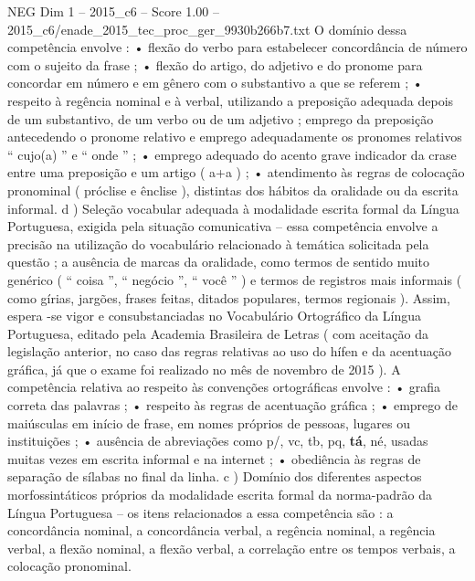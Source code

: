 \begin{textsample}{NEG Dim 1 – 2015\_c6 – Score 1.00 – 2015\_c6/enade\_2015\_tec\_proc\_ger\_9930b266b7.txt}
O domínio dessa competência envolve : • flexão do verbo para estabelecer concordância de número com o sujeito da frase ; • flexão do artigo, do adjetivo e do pronome para concordar em número e em gênero com o substantivo a que se referem ; • respeito à regência nominal e à verbal, utilizando a preposição adequada depois de um substantivo, de um verbo ou de um adjetivo ; emprego da preposição antecedendo o pronome relativo e emprego adequadamente os pronomes relativos “ cujo(a) ” e “ onde ” ; • emprego adequado do acento grave indicador da crase entre uma preposição e um artigo ( a+a ) ; • atendimento às regras de colocação pronominal ( próclise e ênclise ), distintas dos hábitos da oralidade ou da escrita informal. d ) Seleção vocabular adequada à modalidade escrita formal da Língua Portuguesa, exigida pela situação comunicativa – essa competência envolve a precisão na utilização do vocabulário relacionado à temática solicitada pela questão ; a ausência de marcas da oralidade, como termos de sentido muito genérico ( “ coisa ”, “ negócio ”, “ você ” ) e termos de registros mais informais ( como gírias, jargões, frases feitas, ditados populares, termos regionais ).
Assim, espera -se vigor e consubstanciadas no Vocabulário Ortográfico da Língua Portuguesa, editado pela Academia Brasileira de Letras ( com aceitação da legislação anterior, no caso das regras relativas ao uso do hífen e da acentuação gráfica, já que o exame foi realizado no mês de novembro de 2015 ).
A competência relativa ao respeito às convenções ortográficas envolve : • grafia correta das palavras ; • respeito às regras de acentuação gráfica ; • emprego de maiúsculas em início de frase, em nomes próprios de pessoas, lugares ou instituições ; • ausência de abreviações como p/, vc, tb, pq, \textbf{tá}, né, usadas muitas vezes em escrita informal e na internet ; • obediência às regras de separação de sílabas no final da linha. c ) Domínio dos diferentes aspectos morfossintáticos próprios da modalidade escrita formal da norma-padrão da Língua Portuguesa – os itens relacionados a essa competência são : a concordância nominal, a concordância verbal, a regência nominal, a regência verbal, a flexão nominal, a flexão verbal, a correlação entre os tempos verbais, a colocação pronominal.

\end{textsample}
